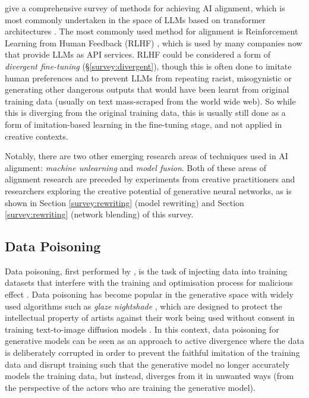 \cite{ji2023ai} give a comprehensive survey of methods for achieving AI alignment, which is most commonly undertaken in the space of LLMs based on transformer architectures \citep{vaswani2017attention}. 
The most commonly used method for alignment is Reinforcement Learning from Human Feedback (RLHF) \citep{ziegler2019fine}, which is used by many companies now that provide LLMs as API services. 
RLHF could be considered a form of \textit{divergent fine-tuning} (\S \ref{survey:divergent}), though this is often done to imitate human preferences and to prevent LLMs from repeating racist, misogynistic or generating other dangerous outputs that would have been learnt from original training data (usually on text mass-scraped from the world wide web).
So while this is diverging from the original training data, this is usually still done as a form of imitation-based learning in the fine-tuning stage, and not applied in creative contexts.

Notably, there are two other emerging research areas of techniques used in AI alignment: \textit{machine unlearning} and \textit{model fusion}. 
Both of these areas of alignment research are preceded by experiments from creative practitioners and researchers exploring the creative potential of generative neural networks, as is shown in Section \ref{survey:rewriting} (model rewriting) and Section \ref{survey:rewriting} (network blending) of this survey.

\subsection{Data Poisoning}

Data poisoning, first performed by \cite{biggio2012poisoning}, is the task of injecting data into training datasets that interfere with the training and optimisation process for malicious effect \citep{fan2022survey}. 
Data poisoning has become popular in the generative space with widely used algorithms such as \textit{glaze} \citep{shan2023glaze} \textit{nightshade} \citep{shan2024nightshade}, which are designed to protect the intellectual property of artists against their work being used without consent in training text-to-image diffusion models \citep{rombach2022high}. 
In this context, data poisoning for generative models can be seen as an approach to active divergence where the data is deliberately corrupted in order to prevent the faithful imitation of the training data and disrupt training such that the generative model no longer accurately models the training data, but instead, diverges from it in unwanted ways (from the perspective of the actors who are training the generative model). 


